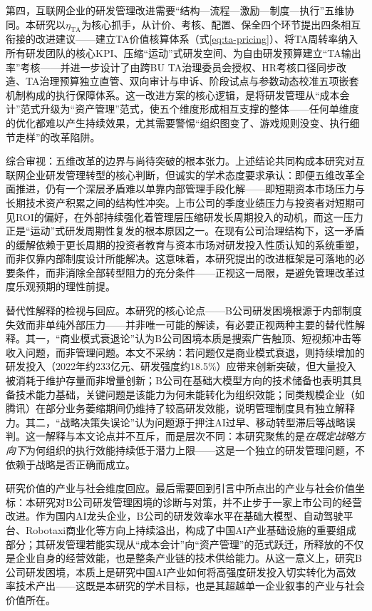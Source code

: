 第四，互联网企业的研发管理改进需要“结构—流程—激励—制度—执行”五维协同。本研究以$\eta_{\mathrm{TA}}$为核心抓手，从计价、考核、配置、保全四个环节提出四条相互衔接的改进建议——建立TA价值核算体系（式\eqref{eq:ta-pricing}）、将TA周转率纳入所有研发团队的核心KPI、压缩“运动”式研发空间、为自由研发预算建立“TA输出率”考核——并进一步设计了由跨BU TA治理委员会授权、HR考核口径同步改造、TA治理预算独立直管、双向审计与申诉、阶段试点与参数动态校准五项嵌套机制构成的执行保障体系。这一改进方案的核心逻辑，是将研发管理从“成本会计”范式升级为“资产管理”范式，使五个维度形成相互支撑的整体——任何单维度的优化都难以产生持续效果，尤其需要警惕“组织图变了、游戏规则没变、执行细节走样”的改革陷阱。

综合审视：五维改革的边界与尚待突破的根本张力。上述结论共同构成本研究对互联网企业研发管理转型的核心判断，但诚实的学术态度要求承认：即便五维改革全面推进，仍有一个深层矛盾难以单靠内部管理手段化解——即短期资本市场压力与长期技术资产积累之间的结构性冲突。上市公司的季度业绩压力与投资者对短期可见ROI的偏好，在外部持续强化着管理层压缩研发长周期投入的动机，而这一压力正是“运动”式研发周期性复发的根本原因之一。在现有公司治理结构下，这一矛盾的缓解依赖于更长周期的投资者教育与资本市场对研发投入性质认知的系统重塑，而非仅靠内部制度设计所能解决。这意味着，本研究提出的改进框架是可落地的必要条件，而非消除全部转型阻力的充分条件——正视这一局限，是避免管理改革过度乐观预期的理性前提。

替代性解释的检视与回应。本研究的核心论点——B公司研发困境根源于内部制度失效而非单纯外部压力——并非唯一可能的解读，有必要正视两种主要的替代性解释。其一，“商业模式衰退论”认为B公司困境本质是搜索广告触顶、短视频冲击等收入问题，而非管理问题。本文不采纳：若问题仅是商业模式衰退，则持续增加的研发投入（2022年约233亿元、研发强度约18.5\%）应带来创新突破，但大量投入被消耗于维护存量而非增量创新；B公司在基础大模型方向的技术储备也表明其具备技术能力基础，关键问题是该能力为何未能转化为组织效能；同类规模企业（如腾讯）在部分业务萎缩期间仍维持了较高研发效能，说明管理制度具有独立解释力。其二，“战略决策失误论”认为问题源于押注AI过早、移动转型滞后等战略误判。这一解释与本文论点并不互斥，而是层次不同：本研究聚焦的是\textit{在既定战略方向下}为何组织的执行效能持续低于潜力上限——这是一个独立的研发管理问题，不依赖于战略是否正确而成立。

研究价值的产业与社会维度回应。最后需要回到引言中所点出的产业与社会价值坐标：本研究对B公司研发管理困境的诊断与对策，并不止步于一家上市公司的经营改进。作为国内AI龙头企业，B公司的研发效率水平在基础大模型、自动驾驶平台、Robotaxi商业化等方向上持续溢出，构成了中国AI产业基础设施的重要组成部分；其研发管理若能实现从“成本会计”向“资产管理”的范式跃迁，所释放的不仅是企业自身的经营效能，也是整条产业链的技术供给能力。从这一意义上，研究B公司研发困境，本质上是研究中国AI产业如何将高强度研发投入切实转化为高效率技术产出——这既是本研究的学术目标，也是其超越单一企业叙事的产业与社会价值所在。


